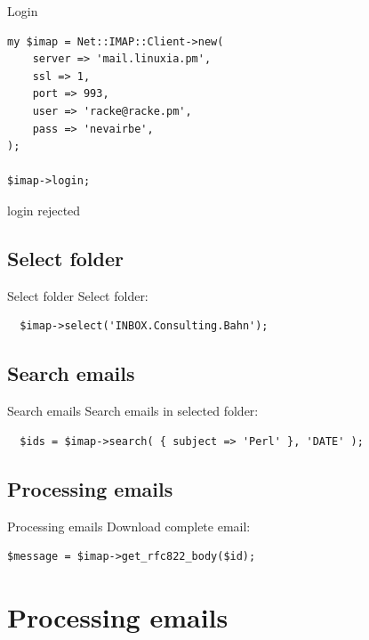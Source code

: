 \begin{frame}[fragile]{Login}
\begin{verbatim}
my $imap = Net::IMAP::Client->new(
    server => 'mail.linuxia.pm',
    ssl => 1,
    port => 993,
    user => 'racke@racke.pm',
    pass => 'nevairbe',
);

$imap->login;
\end{verbatim}
\end{frame}

login rejected

\subsection{Select folder}

\begin{frame}[fragile]{Select folder}
  Select folder:

\begin{verbatim}
  $imap->select('INBOX.Consulting.Bahn');
\end{verbatim}
\end{frame}

\subsection{Search emails}

\begin{frame}[fragile]{Search emails}
  Search emails in selected folder:

\begin{verbatim}
  $ids = $imap->search( { subject => 'Perl' }, 'DATE' );
\end{verbatim}
\end{frame}

\subsection{Processing emails}

\begin{frame}[fragile]{Processing emails}
  Download complete email:

\begin{verbatim}
$message = $imap->get_rfc822_body($id);
\end{verbatim}
\end{frame}

\section{Processing emails}


